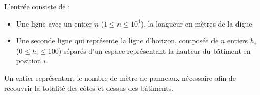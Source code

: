 \begin{Input}
	L'entrée consiste de :
	\begin{itemize}
		\item Une ligne avec un entier $n$ ($1 \le n \le 10^4$), la longueur en mètres de la digue.
		\item Une seconde ligne qui représente la ligne d'horizon, composée de $n$ entiers $h_i$ ($0 \le h_i \le 100$) séparés d'un espace représentant la hauteur du bâtiment en position $i$.
	\end{itemize}
\end{Input}

\begin{Output}
	Un entier représentant le nombre de mètre de panneaux nécessaire afin de recouvrir la totalité des côtés et dessus des bâtiments.
\end{Output}


